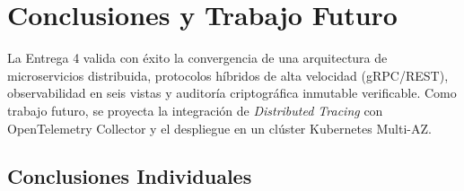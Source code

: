 \documentclass[11pt,a4paper]{article}
\begin{document}
\section{Conclusiones y Trabajo Futuro}
\label{sec:conclusiones-finales}
La Entrega 4 valida con \'exito la convergencia de una arquitectura de microservicios distribuida, protocolos h\'ibridos de alta velocidad (gRPC/REST), observabilidad en seis vistas y auditor\'ia criptogr\'afica inmutable verificable. Como trabajo futuro, se proyecta la integraci\'on de \textit{Distributed Tracing} con OpenTelemetry Collector y el despliegue en un cl\'uster Kubernetes Multi-AZ.

\subsection{Conclusiones Individuales}
\end{document}
